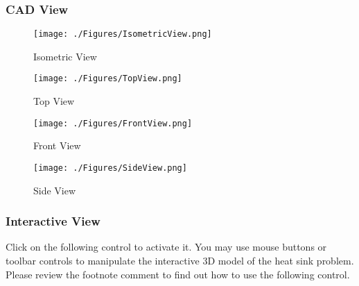 \documentclass[letterpaper,12pt]{article}
\begin{document}
\subsubsection{CAD View}
\begin{figure}[!h!tbp]
\begin{center}
\texttt{[image: ./Figures/IsometricView.png]}
\caption{\label{fig:isometric}Isometric View}
\end{center}
\end{figure}
\begin{figure}[!h!tbp]
\begin{center}
\texttt{[image: ./Figures/TopView.png]}
\caption{\label{fig:top}Top View}
\end{center}
\end{figure}
\begin{figure}[!h!tbp]
\begin{center}
\texttt{[image: ./Figures/FrontView.png]}
\caption{\label{fig:front}Front View}
\end{center}
\end{figure}
\begin{figure}[!h!tbp]
\begin{center}
\texttt{[image: ./Figures/SideView.png]}
\caption{\label{fig:side}Side View}
\end{center}
\end{figure}
\vfill
\newpage
\clearpage
\subsubsection{Interactive View}
Click on the following control to activate it.
You may use mouse buttons or toolbar controls to manipulate
the interactive 3D model of the heat sink problem.\\
Please review the footnote comment\footnotemark
to find out how to use the following control.

\end{document}
